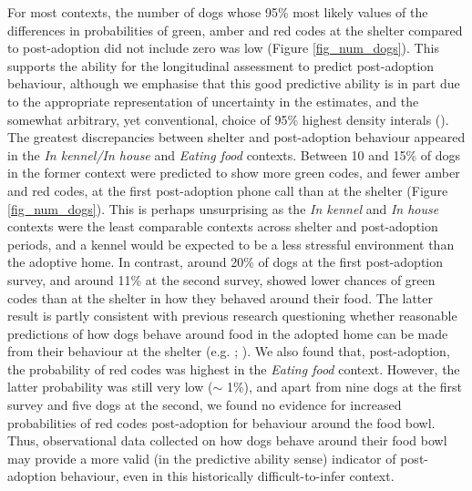 \documentclass[12pt]{article}
\begin{document}
For most contexts, the number of dogs whose 95\% most likely values of the differences in probabilities of green, amber and red codes at the shelter compared to post-adoption did not include zero was low (Figure \ref{fig_num_dogs}). This supports the ability for the longitudinal assessment to predict post-adoption behaviour, although we emphasise that this good predictive ability is in part due to the appropriate representation of uncertainty in the estimates, and the somewhat arbitrary, yet conventional, choice of 95\% highest density interals (\cite{mcelreath2020}). The greatest discrepancies between shelter and post-adoption behaviour appeared in the \textit{In kennel/In house} and \textit{Eating food} contexts. Between 10 and 15\% of dogs in the former context were predicted to show more green codes, and fewer amber and red codes, at the first post-adoption phone call than at the shelter (Figure \ref{fig_num_dogs}). This is perhaps unsurprising as the \textit{In kennel} and \textit{In house} contexts were the least comparable contexts across shelter and post-adoption periods, and a kennel would be expected to be a less stressful environment than the adoptive home. In contrast, around 20\% of dogs at the first post-adoption survey, and around 11\% at the second survey, showed lower chances of green codes than at the shelter in how they behaved around their food. The latter result is partly consistent with previous research questioning whether reasonable predictions of how dogs behave around food in the adopted home can be made from their behaviour at the shelter (e.g. \cite{marder2013}; \cite{mohangibbons2012}). We also found that, post-adoption, the probability of red codes was highest in the \textit{Eating food} context. However, the latter probability was still very low ($\sim$ 1\%), and apart from nine dogs at the first survey and five dogs at the second, we found no evidence for increased probabilities of red codes post-adoption for behaviour around the food bowl. Thus, observational data collected on how dogs behave around their food bowl may provide a more valid (in the predictive ability sense) indicator of post-adoption behaviour, even in this historically difficult-to-infer context.
\end{document}
